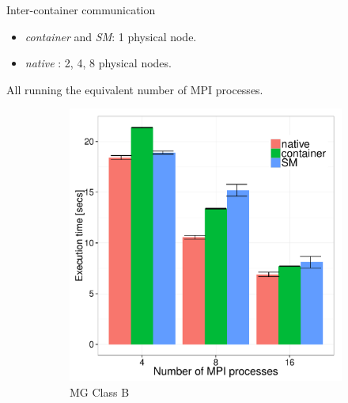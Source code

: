 \documentclass[presentation]{beamer}
\begin{document}
\begin{frame}[label=sec-3-5]{Inter-container communication}
\begin{itemize}
\item \emph{container} and \emph{SM}: 1 physical node.
\item \emph{native} : 2, 4, 8 physical nodes.
\end{itemize}

All running the equivalent number of MPI processes.

\begin{figure}[H]
  \centering
\begin{subfigure}[b]{0.42\textwidth}
    \includegraphics[scale=0.25,angle=0]{figures/inter-container-mgC.pdf}
    \caption{MG Class B}
  \end{subfigure}
  \begin{subfigure}[b]{0.42\textwidth}

\end{subfigure}
\end{figure}
\end{frame}
\end{document}
